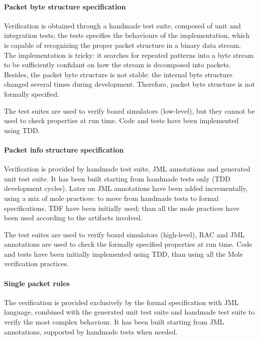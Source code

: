 \documentclass[english]{lni}
\begin{document}
\paragraph*{Packet byte structure specification}

Verification is obtained through a handmade test suite, composed of unit and integration tests; the tests specifies the behaviours of the implementation, which is capable of recognizing the proper packet structure in a binary data stream. 
The implementation is tricky: it searches for repeated patterns into a byte stream to be sufficiently confidant on how the stream is decomposed into packets.
Besides, the packet byte structure is not stable: the internal byte structure changed several times during development.
Therefore, packet byte structure is not formally specified.

The test suites are used to verify board simulators (low-level), but they cannot be used to check properties at run time.
Code and tests have been implemented using TDD.

\paragraph*{Packet info structure specification}

Verification is provided by handmade test suite, JML annotations and generated unit test suite. 
It has been built starting from handmade tests only (TDD development cycles).
Later on JML annotations have been added incrementally, using a mix of mole practices: to move from handmade tests to formal specifications, TDF have been initially used; than all the mole practices have been used according to the artifacts involved.

The test suites are used to verify board simulators (high-level), RAC and JML annotations are used to check the formally specified properties at run time.
Code and tests have been initially implemented using TDD, than using all the Mole verification practices.

\paragraph*{Single packet rules}

The verification is provided exclusively by the formal specification with JML language, combined with the generated unit test suite and handmade test suite to verify the most complex behaviour.
It has been built starting from JML annotations, supported by handmade tests when needed.
\end{document}
